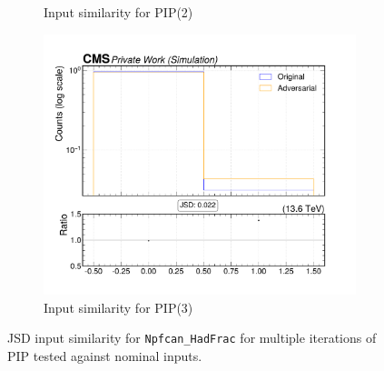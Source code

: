 \begin{figure}[htbp]
\begin{subfigure}[t]{0.32\textwidth}
    \caption{Input similarity for PIP(2)}
  \end{subfigure}\hfill
  \begin{subfigure}[t]{0.32\textwidth}
    \includegraphics[width=\linewidth]{media/output/features/compare/intprob_3/cmp_npf_arr_Npfcan_HadFrac.pdf}
    \caption{Input similarity for PIP(3)}
  \end{subfigure}

  \caption{JSD input similarity for \texttt{Npfcan\_HadFrac} for multiple iterations of PIP tested against nominal inputs.}
  \label{fig:intprob_input_Npfcan_HadFrac}
\end{figure}
